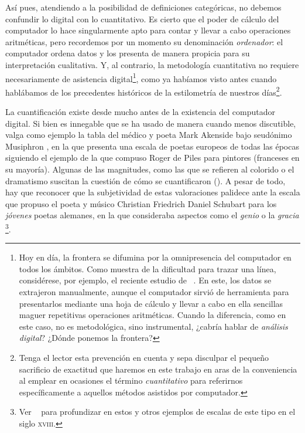 Así pues, atendiendo a la posibilidad de definiciones categóricas, no debemos confundir lo digital con lo cuantitativo. Es cierto que el poder de cálculo del computador lo hace singularmente apto para contar y llevar a cabo operaciones aritméticas, pero recordemos por un momento su denominación \textit{ordenador}: el computador ordena datos y los presenta de manera propicia para su interpretación cualitativa. Y, al contrario, la metodología cuantitativa no requiere necesariamente de asistencia digital\footnote{Hoy en día, la frontera se difumina por la omnipresencia del computador en todos los ámbitos. Como muestra de la dificultad para trazar una línea, considérese, por ejemplo, el reciente estudio de \citeauthor{aichinger2023}~\parencite*{aichinger2023}. En este, los datos se extrajeron manualmente, aunque el computador sirvió de herramienta para presentarlos mediante una hoja de cálculo y llevar a cabo en ella sencillas maguer repetitivas operaciones aritméticas. Cuando la diferencia, como en este caso, no es metodológica, sino instrumental, ¿cabría hablar de \textit{análisis digital}? ¿Dónde ponemos la frontera?}, como ya habíamos visto antes cuando hablábamos de los precedentes históricos de la estilometría de nuestros días\footnote{Tenga el lector esta prevención en cuenta  y sepa disculpar el pequeño sacrificio de exactitud que haremos en este trabajo en aras de la conveniencia al emplear en ocasiones el término \textit{cuantitativo} para referirnos específicamente a aquellos métodos asistidos por computador.}.

 

La cuantificación existe desde mucho antes de la existencia del computador digital. Si bien es innegable que se ha usado de manera cuando menos discutible, valga como ejemplo la tabla del médico y poeta Mark Akenside bajo seudónimo Musiphron \parencite*{musiphron1746}, en la que presenta una escala de poetas europeos de todas las épocas siguiendo el ejemplo de la que compuso Roger de Piles \parencite*[489-498]{piles1708} para pintores (franceses en su mayoría). Algunas de las magnitudes, como las que se refieren al colorido o el dramatismo suscitan la cuestión de cómo se cuantificaron (). A pesar de todo, hay que reconocer que la subjetividad de estas valoraciones palidece ante la escala que propuso el poeta y músico Christian Friedrich Daniel Schubart para los \textit{jóvenes} poetas alemanes, en la que consideraba aspectos como el \textit{genio} o la \textit{gracia} \parencite{schubart1792}\footnote{Ver \citeauthor{spoerhase2018}~\parencite*{spoerhase2018} para profundizar en estos y otros ejemplos de escalas de este tipo en el siglo \textsc{xviii}.}.

